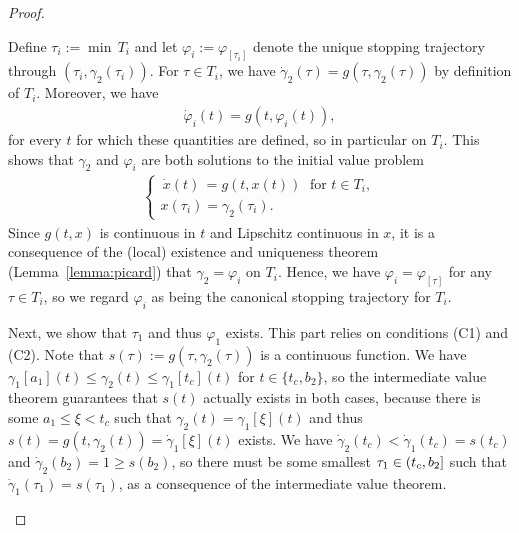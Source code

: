 \documentclass[a4paper]{article}
\theoremstyle{definition}
\theoremstyle{plain}
\begin{document}
\begin{proof}
\begin{outline}
  \2 Define $\tau_{i} := \min \, T_{i}$ and let $\varphi_{i} := \varphi_{[\tau_{i}]}$
  denote the unique stopping trajectory through $(\tau_{i}, \gamma_{2}(\tau_{i}))$.
  For $\tau \in T_{i}$, we have
  $\dot{\gamma}_{2}(\tau) = g(\tau, \gamma_{2}(\tau))$ by definition of $T_{i}$.
  Moreover, we have
  \begin{align}\label{eq:phi-tangent}
    \dot{\varphi}_{i}(t) = g(t, \varphi_{i}(t)),
  \end{align}
  for every $t$ for which these quantities are defined, so in particular on $T_{i}$.
  This shows that $\gamma_{2}$ and $\varphi_{i}$ are both solutions to the initial value problem
  \begin{align}
    \begin{cases}
      \,\dot{x}(t)\, = g(t, x(t)) \;  \text{ for } t \in T_{i} , \\
      x(\tau_{i}) = \gamma_{2}(\tau_{i}) .
    \end{cases}
  \end{align}
  Since $g(t, x)$ is continuous in $t$ and Lipschitz continuous in $x$, it is a
  consequence of the (local) existence and uniqueness theorem
  (Lemma~\ref{lemma:picard}) that $\gamma_{2} = \varphi_{i}$ on $T_{i}$.
  Hence, we have $\varphi_{i} = \varphi_{[\tau]}$ for any $\tau \in T_{i}$, so we regard
  $\varphi_{i}$ as being the canonical stopping trajectory for $T_{i}$.


  \1 Next, we show that $\tau_{1}$ and thus $\varphi_{1}$ exists.
  This part relies on conditions (C1) and (C2).
  Note that $s(\tau) := g(\tau, \gamma_{2}(\tau))$ is a continuous function.
  We have $\gamma_{1}[a_{1}](t) \leq \gamma_{2}(t) \leq \gamma_{1}[t_{c}](t)$ for
  $t \in \{ t_{c}, b_{2} \}$, so the intermediate value theorem guarantees that
  $s(t)$ actually exists in both cases, because there is some
  $a_{1} \leq \xi < t_{c}$ such that $\gamma_{2}(t) = \gamma_{1}[\xi](t)$ and thus
  $s(t) = g(t, \gamma_{2}(t)) = \dot{\gamma}_{1}[\xi](t)$ exists.
  We have $\dot{\gamma}_{2}(t_{c}) < \dot{\gamma}_{1}(t_{c}) = s(t_{c})$ and
  $\dot{\gamma}_{2}(b_{2}) = 1 \geq s(b_{2})$, so there must be some smallest
  $\tau_{1} \in (t_{c},b_{2}]$ such that
  $\dot{\gamma}_{1}(\tau_{1}) = s(\tau_{1})$, as a consequence of the
  intermediate value theorem.


\end{outline}
\end{proof}
\end{document}
